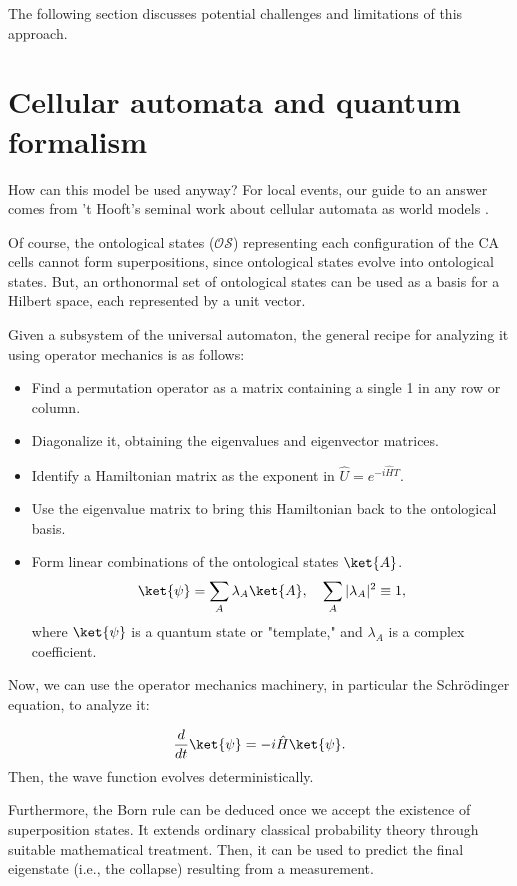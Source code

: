 \documentclass[12pt]{article}
\begin{document}
The following section discusses potential challenges and limitations of this approach.


\section{Cellular automata and quantum formalism} \label{sec:bridge}How can this model be used anyway? For local events, our guide to an answer comes from 't Hooft's seminal work about cellular automata as world models \cite{thooft}.

Of course, the ontological states ($\mathcal{OS}$) representing each configuration of the CA cells cannot form superpositions, since ontological states evolve into ontological states. But, an orthonormal set of ontological states can be used as a basis for a Hilbert space, each represented by a unit vector.

Given a subsystem of the universal automaton, the general recipe for analyzing it using operator mechanics is as follows:

\begin{itemize}
    \item Find a permutation operator as a matrix containing a single 1 in any row or column.
    \item Diagonalize it, obtaining the eigenvalues and eigenvector matrices.
    \item Identify a Hamiltonian matrix as the exponent in $\hat{U}=e^{-i\hat{H}T}$.
    \item Use the eigenvalue matrix to bring this Hamiltonian back to the ontological basis.
    \item Form linear combinations of the ontological states $\ket{A}$.
\[
\ket{\psi} = \sum_A \lambda_A \ket{A}, \quad \sum_A |\lambda_A|^2 \equiv 1,
\]
where $\ket{\psi}$ is a quantum state or "template," and $\lambda_A$ is a complex coefficient.
\end{itemize}

Now, we can use the operator mechanics machinery, in particular the Schrödinger equation, to analyze it:

\[
\frac{d}{dt}\ket{\psi} = -i\hat{H}\ket{\psi}.
\]
Then, the wave function evolves deterministically.

Furthermore, the Born rule can be deduced once we accept the existence of superposition states. It extends ordinary classical probability theory through suitable mathematical treatment. Then, it can be used to predict the final eigenstate (i.e., the collapse) resulting from a measurement.
\end{document}
